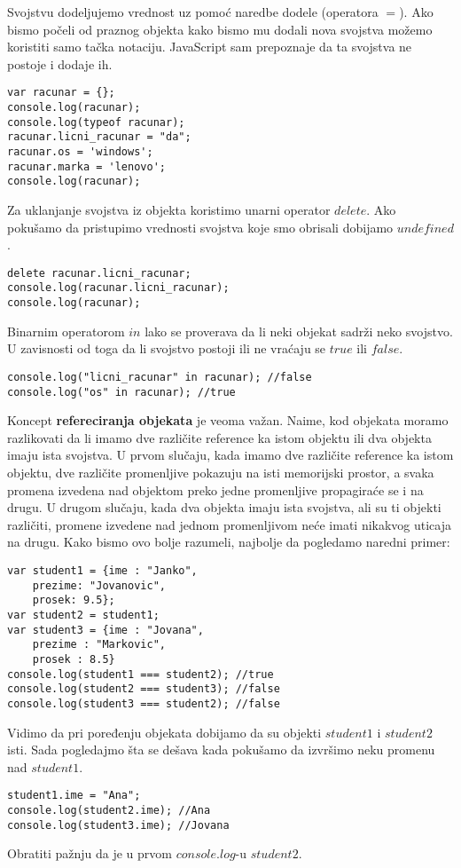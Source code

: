 Svojstvu dodeljujemo vrednost uz pomoć naredbe dodele (operatora $=$). Ako bismo počeli od praznog objekta kako bismo mu dodali nova svojstva možemo koristiti samo tačka notaciju. JavaScript sam prepoznaje da ta svojstva ne postoje i dodaje ih. 
\begin{lstlisting}[backgroundcolor = \color{lightgray}, breaklines=true]
var racunar = {};
console.log(racunar);
console.log(typeof racunar);
racunar.licni_racunar = "da";
racunar.os = 'windows';
racunar.marka = 'lenovo';
console.log(racunar);
\end{lstlisting}
Za uklanjanje svojstva iz objekta koristimo unarni operator $delete$.
Ako pokušamo da pristupimo vrednosti svojstva koje smo obrisali dobijamo $undefined$.
\begin{lstlisting}[backgroundcolor = \color{lightgray}, breaklines=true]
delete racunar.licni_racunar;
console.log(racunar.licni_racunar);
console.log(racunar);
\end{lstlisting}

Binarnim operatorom $in$ lako se proverava da li neki objekat sadrži neko svojstvo. U zavisnosti od toga da li svojstvo postoji ili ne vraćaju se $true$ ili $false$.
\begin{lstlisting}[backgroundcolor = \color{lightgray}, breaklines=true]
console.log("licni_racunar" in racunar); //false
console.log("os" in racunar); //true
\end{lstlisting}

Koncept \textbf{refereciranja objekata} je veoma važan. Naime, kod objekata moramo razlikovati da li imamo dve različite reference ka istom objektu ili dva objekta imaju ista svojstva. U prvom slučaju, kada imamo dve različite reference ka istom objektu, dve različite promenljive pokazuju na isti memorijski prostor, a svaka promena izvedena nad objektom preko jedne promenljive propagiraće se i na drugu. U drugom slučaju, kada dva objekta imaju ista svojstva, ali su ti objekti različiti, promene izvedene nad jednom promenljivom neće imati nikakvog uticaja na drugu. Kako bismo ovo bolje razumeli, najbolje da pogledamo naredni primer:
\begin{lstlisting}[backgroundcolor = \color{lightgray}, breaklines=true]
var student1 = {ime : "Janko",
	prezime: "Jovanovic",
	prosek: 9.5};
var student2 = student1;
var student3 = {ime : "Jovana",
	prezime : "Markovic",
	prosek : 8.5}
console.log(student1 === student2); //true
console.log(student2 === student3); //false
console.log(student3 === student2); //false
\end{lstlisting}
Vidimo da pri poređenju objekata dobijamo da su objekti $student1$ i $student2$ isti. Sada pogledajmo šta se dešava kada pokušamo da izvršimo neku promenu nad $student1$. 
\begin{lstlisting}[backgroundcolor = \color{lightgray}, breaklines=true]
student1.ime = "Ana";
console.log(student2.ime); //Ana
console.log(student3.ime); //Jovana
\end{lstlisting}
Obratiti pažnju da je u prvom $console.log$-u $student2$.

